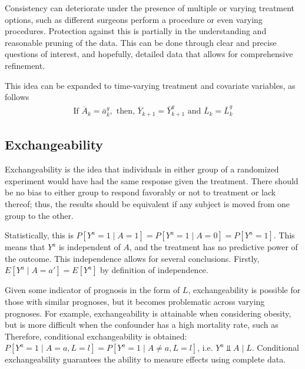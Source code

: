 Consistency can deteriorate under the presence of multiple or varying treatment options, such as different surgeons perform a procedure or even varying procedures.  Protection against this is partially in the understanding and reasonable pruning of the data.  This can be done through clear and precise questions of interest, and hopefully, detailed data that allows for comprehensive refinement.  

This idea can be expanded to time-varying treatment and covariate variables, as follows 
\begin{align} 
\text{If } \overline{A}_k = \bar{a}^g _k, \text{ then, } \overline{Y}_{k+1} =  \bar{Y}^g_{k+1} \text{ and } \overline{L}_k = \bar{L}^g_k
\end{align}

\subsection{Exchangeability} \label{exchangeability} 
Exchangeability is the idea that individuals in either group of a randomized experiment would have had the same response given the treatment. \cite{hernan_robins_2016}  There should be no bias to either group to respond favorably or not to treatment or lack thereof; thus, the results should be equivalent if any subject is moved from one group to the other.  
 
Statistically, this is $P[Y^a = 1 \mid A = 1] = P[Y^a = 1 \mid A = 0] = P[Y^a = 1]$.  This means that $Y^a$ is independent of $A$, and the treatment has no predictive power of the outcome.  This independence allows for several conclusions.  Firstly, $E[Y^a \mid A = a'] = E[Y^a]$ by definition of independence.  

Given some indicator of prognosis in the form of $L$, exchangeability is possible for those with similar prognoses, but it becomes problematic across varying prognoses.  For example, exchangeability is attainable when considering obesity, but is more difficult when the confounder has a high mortality rate, such as    Therefore, conditional exchangeability is obtained: $P[Y^a = 1 \mid A = a, L=l] = P[Y^a = 1 \mid A \neq a, L=l]$, i.e. $Y^{a} \Perp A\mid L$. \cite{hernan_robins_2016}  Conditional exchangeability guarantees the ability to measure effects using complete data.  

